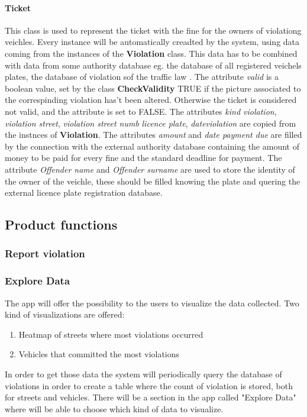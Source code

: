 \paragraph{Ticket}
This class is used to represent the ticket with the fine for the owners of violationg veichles. Every instance will be automatically creadted by the system, using data coming from the instances of the \textbf{Violation} class. This data has to be combined with data from some authority database eg. the database of all registered veichels plates, the database of violation sof the traffic law .
The attribute \textit{valid} is a boolean value, set by the class \textbf{CheckValidity} TRUE if the picture associated to the correspinding violation has't been altered. Otherwise the ticket is considered not valid, and the attribute is set to FALSE.
The attributes \textit{kind violation}, \textit{violation street}, \textit{violation street numb} \textit{licence plate}, \textit{dateviolation} are copied from the instnces of \textbf{Violation}.
The attributes \textit{amount} and \textit{date payment due} are filled by the connection with the external authority database containing the amount of money to be paid for every fine and the standard deadline for payment.
The attribute \textit{Offender name} and \textit{Offender surname} are used to store the identity of the owner of the veichle, these should be filled knowing the plate and quering the external licence plate registration database.











\subsection{Product functions}

\subsubsection{Report violation}

\subsubsection{Explore Data}
The app will offer the possibility to the users to visualize the data collected.
Two kind of visualizations are offered:
\begin{enumerate}
  \item Heatmap of streets where most violations occurred
  \item Vehicles that committed the most violations \label{blacklistplates}
\end{enumerate}
In order to get those data the system will periodically query the database of violations in order to create a table where the count of violation is stored, both for streets and vehicles.
There will be a section in the app called "Explore Data" where will be able to choose which kind of data to visualize.


